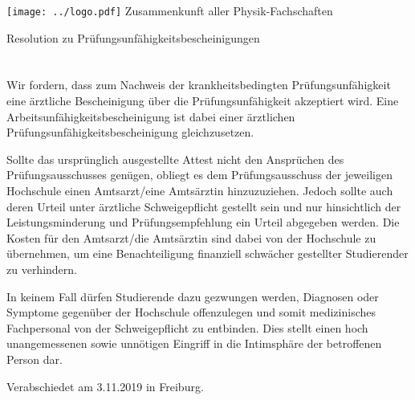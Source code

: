 \documentclass[DIV=calc]{scrartcl}
\begin{document}
\hspace{0.87\textwidth}
\begin{minipage}{120pt}
	\vspace{-1.8cm}
	\texttt{[image: ../logo.pdf]}
	\centering
	\small Zusammenkunft aller Physik-Fachschaften
\end{minipage}

\begin{center}
\huge{Resolution zu Prüfungsunfähigkeitsbescheinigungen} \\
\normalsize
\end{center}



\section*{}
  Wir fordern, dass zum Nachweis der krankheitsbedingten Prüfungsunfähigkeit eine ärztliche Bescheinigung über die Prüfungsunfähigkeit akzeptiert wird. Eine Arbeitsunfähigkeitsbescheinigung ist dabei einer ärztlichen Prüfungsunfähigkeitsbescheinigung gleichzusetzen.

  Sollte das ursprünglich ausgestellte Attest nicht den Ansprüchen des Prüfungsausschusses genügen, obliegt es dem Prüfungsausschuss der jeweiligen Hochschule einen Amtsarzt/eine Amtsärztin hinzuzuziehen. Jedoch sollte auch deren Urteil unter ärztliche Schweigepflicht   gestellt sein und nur hinsichtlich der Leistungsminderung und Prüfungsempfehlung ein Urteil abgegeben werden. Die Kosten für den Amtsarzt/die Amtsärztin sind dabei von der Hochschule zu übernehmen, um eine Benachteiligung finanziell schwächer gestellter Studierender zu verhindern.

  In keinem Fall dürfen Studierende dazu gezwungen werden, Diagnosen oder Symptome  gegenüber der Hochschule offenzulegen und somit medizinisches Fachpersonal von der Schweigepflicht zu entbinden. Dies stellt einen  hoch unangemessenen sowie unnötigen Eingriff in die Intimsphäre der betroffenen Person dar.

\vfill
\begin{flushright}
Verabschiedet am 3.11.2019 in Freiburg.
\end{flushright}
\end{document}

